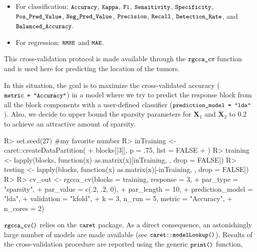 \documentclass[
]{jss}
\begin{document}
\begin{itemize}
\item
  For classification: \(\small{\texttt{Accuracy}}\),
  \(\small{\texttt{Kappa}}\), \(\small{\texttt{F1}}\),
  \(\small{\texttt{Sensitivity}}\), \(\small{\texttt{Specificity}}\),
  \(\small{\texttt{Pos\_Pred\_Value}}\),
  \(\small{\texttt{Neg\_Pred\_Value}}\), \(\small{\texttt{Precision}}\),
  \(\small{\texttt{Recall}}\), \(\small{\texttt{Detection\_Rate}}\), and
  \(\small{\texttt{Balanced\_Accuracy}}\).
\item
  For regression: \(\small{\texttt{RMSE}}\) and
  \(\small{\texttt{MAE}}\).
\end{itemize}

This cross-validation protocol is made available through the
\(\small{\texttt{rgcca\_cv}}\) function and is used here for predicting
the location of the tumors.

In this situation, the goal is to maximize the cross-validated accuracy
(\(\small{\texttt{metric = "Accuracy"}}\)) in a model where we try to
predict the response block from all the block components with a
user-defined classifier
(\(\small{\texttt{prediction\_model = "lda"}}\)). Also, we decide to
upper bound the sparsity parameters for \(\mathbf X_1\) and
\(\mathbf X_2\) to \(0.2\) to achieve an attractive amount of sparsity.

\footnotesize

\begin{CodeChunk}
\begin{CodeInput}
R> set.seed(27) #my favorite number
R> inTraining <- caret::createDataPartition(
+   blocks[[3]], p = .75, list = FALSE
+ )
R> training <- lapply(blocks, function(x) as.matrix(x)[inTraining, , drop = FALSE])
R> testing <- lapply(blocks, function(x) as.matrix(x)[-inTraining, , drop = FALSE])
R> 
R> cv_out <- rgcca_cv(blocks = training, response = 3,
+                    par_type = "sparsity",
+                    par_value = c(.2, .2, 0),
+                    par_length = 10,
+                    prediction_model = "lda",
+                    validation = "kfold",
+                    k = 3, n_run = 5, metric = "Accuracy",
+                    n_cores = 2)
\end{CodeInput}
\end{CodeChunk}

\normalsize

\(\small{\texttt{rgcca\_cv()}}\) relies on the
\(\small{\texttt{caret}}\) package. As a direct consequence, an
astonishingly large number of models are made available (see
\(\small{\texttt{caret::modelLookup()}}\)). Results of the
cross-validation procedure are reported using the generic
\(\small{\texttt{print()}}\) function,
\end{document}
